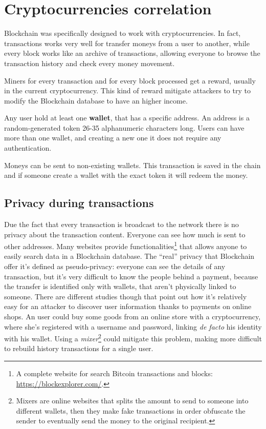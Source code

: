 \section{Cryptocurrencies correlation}
\label{sec:crypto_corr}

Blockchain was specifically designed to work with cryptocurrencies. In fact,
transactions works very well for transfer moneys from a user to another, while
every block works like an archive of transactions, allowing everyone to browse
the transaction history and check every money movement.

Miners for every transaction and for every block processed get a reward,
usually in the current cryptocurrency. This kind of reward mitigate attackers to
try to modify the Blockchain database to have an higher income.

Any user hold at least one \textbf{wallet}, that has a specific address. An
address is a random-generated token 26-35 alphanumeric characters long. Users
can have more than one wallet, and creating a new one it does not require any
authentication.

Moneys can be sent to non-existing wallets. This transaction is saved in the
chain and if someone create a wallet with the exact token it will redeem
the money.

\subsection{Privacy during transactions}

Due the fact that every transaction is broadcast to the network there is no
privacy about the transaction content. Everyone can see how much is sent to
other addresses. Many websites provide functionalities\footnote{A complete
website for search Bitcoin transactions and blocks:
\url{https://blockexplorer.com/}.} that allows anyone to easily search data in a
Blockchain database. The ``real'' privacy that Blockchain offer it's defined as
pseudo-privacy: everyone can see the details of any transaction, but it's very
difficult to know the people behind a payment, because the transfer is
identified only with wallets, that aren't physically linked to someone. There
are different studies \cite{guadamuz15} though that point out how it's
relatively easy for an attacker to discover user information thanks to payments
on online shops. An user could buy some goods from an online store with a
cryptocurrency, where she's registered with a username and password, linking
\textit{de facto} his identity with his wallet. Using a
\textit{mixer}\footnote{Mixers are online websites that splits the amount to
send to someone into different wallets, then they make fake transactions in
order obfuscate the sender to eventually send the money to the original
recipient.} could mitigate this problem, making more difficult to rebuild
history transactions for a single user.

